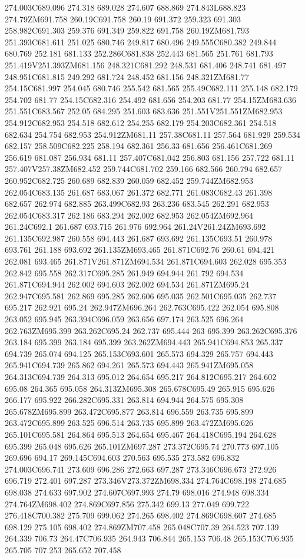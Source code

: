274.003C689.096 274.318 689.028 274.607 688.869 274.843L688.823 274.79ZM691.758 260.19C691.758 260.19 691.372 259.323 691.303 258.982C691.303 259.376 691.349 259.822 691.758 260.19ZM681.793 251.393C681.611 251.025 680.746 249.817 680.496 249.555C680.382 249.844 680.769 252.181 681.133 252.286C681.838 252.443 681.565 251.761 681.793 251.419V251.393ZM681.156 248.321C681.292 248.531 681.406 248.741 681.497 248.951C681.815 249.292 681.724 248.452 681.156 248.321ZM681.77 254.15C681.997 254.045 680.746 255.542 681.565 255.49C682.111 255.148 682.179 254.702 681.77 254.15C682.316 254.492 681.656 254.203 681.77 254.15ZM683.636 251.551C683.567 252.05 684.295 251.603 683.636 251.551V251.551ZM682.953 254.912C682.953 254.518 682.612 254.255 682.179 254.203C682.361 254.518 682.634 254.754 682.953 254.912ZM681.11 257.38C681.11 257.564 681.929 259.534 682.157 258.509C682.225 258.194 682.361 256.33 681.656 256.461C681.269 256.619 681.087 256.934 681.11 257.407C681.042 256.803 681.156 257.722 681.11 257.407V257.38ZM682.452 259.744C681.702 259.166 682.566 260.794 682.657 260.952C682.725 260.689 682.839 260.059 682.452 259.744ZM682.953 262.054C683.135 261.687 683.067 261.372 682.771 261.083C682.43 261.398 682.657 262.974 682.885 263.499C682.93 263.236 683.545 262.291 682.953 262.054C683.317 262.186 683.294 262.002 682.953 262.054ZM692.964 261.24C692.1 261.687 693.715 261.976 692.964 261.24V261.24ZM693.692 261.135C692.987 260.558 694.443 261.687 693.692 261.135C693.51 260.978 693.761 261.188 693.692 261.135ZM693.465 261.871C692.76 260.61 694.421 262.081 693.465 261.871V261.871ZM694.534 261.871C694.603 262.028 695.353 262.842 695.558 262.317C695.285 261.949 694.944 261.792 694.534 261.871C694.944 262.002 694.603 262.002 694.534 261.871ZM695.24 262.947C695.581 262.869 695.285 262.606 695.035 262.501C695.035 262.737 695.217 262.921 695.24 262.947ZM696.264 262.763C695.422 262.054 695.808 263.052 695.945 263.394C696.059 263.656 697.174 263.525 696.264 262.763ZM695.399 263.262C695.24 262.737 695.444 263 695.399 263.262C695.376 263.184 695.399 263.184 695.399 263.262ZM694.443 265.941C694.853 265.337 694.739 265.074 694.125 265.153C693.601 265.573 694.329 265.757 694.443 265.941C694.739 265.862 694.261 265.573 694.443 265.941ZM695.058 264.313C694.739 264.313 695.012 264.654 695.217 264.812C695.217 264.602 695.08 264.365 695.058 264.313ZM695.308 265.678C695.49 265.915 695.626 266.177 695.922 266.282C695.331 263.814 694.944 264.575 695.308 265.678ZM695.899 263.472C695.877 263.814 696.559 263.735 695.899 263.472C695.899 263.525 696.514 263.735 695.899 263.472ZM695.626 265.101C695.581 264.864 695.513 264.654 695.467 264.418C695.194 264.628 695.399 265.048 695.626 265.101ZM697.287 273.372C695.74 270.773 697.105 269.696 694.17 269.145C694.603 270.563 695.535 273.582 696.832 274.003C696.741 273.609 696.286 272.663 697.287 273.346C696.673 272.926 696.719 272.401 697.287 273.346V273.372ZM698.334 274.764C698.198 274.685 698.038 274.633 697.902 274.607C697.993 274.79 698.016 274.948 698.334 274.764ZM698.402 274.869C697.856 275.342 699.13 277.049 699.722 276.418C700.382 275.709 699.062 274.265 698.402 274.869C698.607 274.685 698.129 275.105 698.402 274.869ZM707.458 265.048C707.39 264.523 707.139 264.339 706.73 264.47C706.935 264.943 706.844 265.153 706.48 265.153C706.935 265.705 707.253 265.652 707.458 